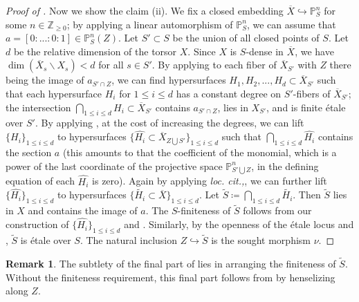 \documentclass[11pt, reqno]{amsart}
\theoremstyle{plain}
\theoremstyle{definition}
\newtheorem{remark}[theorem]{Remark}
\begin{document}
\begin{proof}[Proof of ]
    Now we show the claim (ii). We fix a closed embedding $\overline{X}\hookrightarrow \mathbb{P}_S^n$ for some $n\in\mathbb{Z}_{\geq 0}$; by applying a linear automorphism of $\mathbb{P}_S^n$, we can assume that $a=[0:...:0:1]\in \mathbb{P}_S^n(Z)$. Let $S'\subset S$ be the union of all closed points of $S$. Let $d$ be the relative dimension of the torsor $X$. Since $X$ is $S$-dense in $\overline{X}$, we have $\dim(\overline{X}_s\backslash X_s)< d$ for all $s\in S'$. By applying  to each fiber of $\overline{X}_{S'}$ with $Z$ there being the image of $a_{S'\cap Z}$, we can find hypersurfaces $H_1, H_2,..., H_d\subset \overline{X}_{S'}$ such that each hypersurface $H_i$ for $1\leq i\leq d$ has a constant degree on $S'$-fibers of $\overline{X}_{S'}$; the intersection $\bigcap_{1\leq i\leq d}H_i\subset \overline{X}_{S'}$ contains $a_{S'\cap Z}$, lies in $X_{S'}$, and is finite étale over $S'$. By applying \cite[corollaire~2.2.4]{EGA3I}, at the cost of increasing the degrees, we can lift $\{H_i\}_{1\leq i\leq d}$ to hypersurfaces $\{\hat{H_i}\subset \overline{X}_{Z\bigcup S'}\}_{1\leq i\leq d}$ such that $\bigcap_{1\leq i\leq d}\hat{H_i}$ contains the section $a$ (this amounts to that the coefficient of the monomial, which is a power of the last coordinate of the projective space $\mathbb{P}^n_{S'\bigcup Z}$, in the defining equation of each $\hat{H_i}$ is zero). Again by applying \emph{loc. cit.,}, we can further lift $\{\hat{H_i}\}_{1\leq i\leq d}$ to hypersurfaces $\{\widetilde{H_i}\subset \overline{X}\}_{1\leq i\leq d}$. Let $\widetilde{S}\coloneq \bigcap_{1\leq i\leq d}\widetilde{H_i}$. Then $\widetilde{S}$ lies in $X$ and contains the image of $a$. The $S$-finiteness of $\widetilde{S}$ follows from our construction of $\{\hat{H_i}\}_{1\leq i\leq d}$ and \cite[01TI, 02OG]{stacks-project}. Similarly, by the openness of the étale locus \cite[02GH]{stacks-project} and \cite[02IL]{stacks-project}, $\widetilde{S}$ is étale over $S$. The natural inclusion $Z\hookrightarrow \widetilde{S}$ is the sought morphism $\nu$.
\end{proof}

\begin{remark}
    The subtlety of the final part of  lies in arranging the finiteness of $\widetilde{S}$. Without the finiteness requirement, this final part follows from \cite[Proposition~6.1.1~(a)]{CKproblemtorsors} by henselizing along $Z$.
\end{remark}
\end{document}
